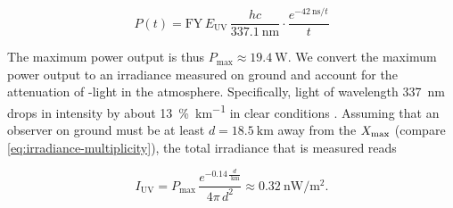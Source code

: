 \begin{equation}
\label{eq:irradiance-power}
P(t)= \text{FY}\,E_\text{UV}\,\frac{hc}{\SI{337.1}{\nano\meter}} \cdot\frac{e^{-\SI{42}{\nano\second}/t}}{t}   
\end{equation}

The maximum power output is thus $P_\text{max}\approx\SI{19.4}{\watt}$. We 
convert the maximum power output to an irradiance measured on ground and account
for the attenuation of \UB-light in the atmosphere. Specifically, light of 
wavelength \SI{337}{\nano\meter} drops in intensity by about 
\SI{13}{\percent\per\kilo\meter}  in clear conditions 
\cite[see Fig. 83 on page 103 of][]{baumAttenuationUltravioletLight2008}. 
Assuming that an observer on ground must be at least $d=\SI{18.5}{\kilo\meter}$ 
away from the $X_\mathrm{max}$ (compare \cref{eq:irradiance-multiplicity}), the total 
irradiance that is measured reads

\begin{equation}
\label{eq:irradiance}
I_\text{UV} = P_\text{max}\,\frac{e^{-0.14\,\frac{d}{\SI{}{\kilo\meter}}}}{4\pi\,d^2}\approx\SI{0.32}{\nano\watt\per\square\meter}.
\end{equation}
